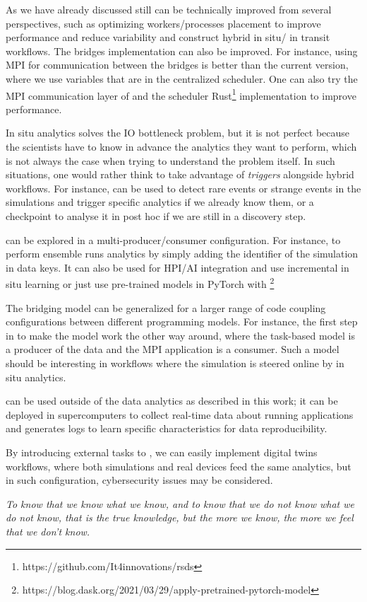 As we have already discussed \deisa still can be technically improved from several perspectives, such as optimizing workers/processes placement to improve performance and reduce variability and construct hybrid in situ/ in transit workflows. 
The \deisa bridges implementation can also be improved. For instance, using MPI for communication between the bridges is better than the current version, where we use \dask variables that are in the centralized scheduler. One can also try the MPI communication layer of \dask\cite{shafi_efficient_2021} and the scheduler Rust\footnote{https://github.com/It4innovations/rsds} implementation to improve performance.   

In situ analytics solves the IO bottleneck problem, but it is not perfect because the scientists have to know in advance the analytics they want to perform, which is not always the case when trying to understand the problem itself. In such situations, one would rather think to take advantage of \textit{triggers} alongside hybrid workflows. For instance, \deisa can be used to detect rare events or strange events in the simulations and trigger specific analytics if we already know them, or a checkpoint to analyse it in post hoc if we are still in a discovery step. 

\deisa can be explored in a multi-producer/consumer configuration. For instance, to perform ensemble runs analytics by simply adding the identifier of the simulation in data keys.  
It can also be used for HPI/AI integration and use incremental in situ learning or just use pre-trained models in PyTorch with \dask \footnote{ https://blog.dask.org/2021/03/29/apply-pretrained-pytorch-model}

The \deisa bridging model can be generalized for a larger range of code coupling configurations between different programming models. For instance, the first step in to make the model work the other way around, where the task-based model is a producer of the data and the MPI application is a consumer. Such a model should be interesting in workflows where the simulation is steered online by in situ analytics. 

\deisa can be used outside of the data analytics as described in this work; it can be deployed in supercomputers to collect real-time data about running applications and generates logs to learn specific characteristics for data reproducibility.  

By introducing external tasks to \dask,  we can easily implement digital twins workflows, where both simulations and real devices feed the same \dask analytics, but in such configuration, cybersecurity issues may be considered.  





\vfill
\textit{To know that we know what we know, and to know that we do not know what we do not know, that is the true knowledge, but the more we know, the more we feel that we don't know. }